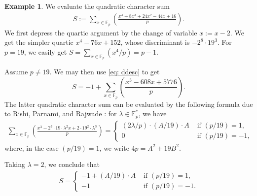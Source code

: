 \documentclass[11pt]{amsart}
\newcommand{\F}{\mathbb{F}}
\newcommand{\Fp}{\F_{\!p}}
\theoremstyle{definition}
\newtheorem{ex}{Example}[section]
\begin{document}
\begin{ex}
We evaluate the quadratic character sum
\begin{align}
S:=\sum_{x\in \Fp} \left(\frac{x^4+8x^3+24x^2-44x+16}{p}\right).
\end{align}
We first depress the quartic argument by the change of variable $x:=x-2$. We get the simpler quartic $x^4-76x+152$, whose discriminant is $-2^8\cdot 19^3$. For $p=19$, we easily get $S=\sum_{x\in \Fp} (x^4/p)=p-1$.

Assume $p\neq 19$. We may then use \eqref{eq: ddesc} to get
\[S=-1+\sum_{x\in \Fp} \left(\frac{x^3-608 x+5776}{p}\right).\]
The latter quadratic character sum can be evaluated by the following formula due to Rishi, Parnami, and Rajwade \cite{RPR}: for $\lambda\in \Fp^*$, we have
\begin{align*}
\sum_{x\in \Fp} \left(\frac{x^3-2^3\cdot 19\cdot  \lambda^2 x+2\cdot 19^2\cdot \lambda^3}{p}\right)=
\begin{cases}
(2\lambda /p) \cdot (A/19)\cdot A & \textrm{ if } (p/19)=1,\\ 
0  & \textrm{ if } (p/19)=-1,
\end{cases}
\end{align*}
where, in the case $(p/19)=1$, we write $4p=A^2+19B^2$.

Taking $\lambda=2$, we conclude that
\begin{align}
S=\begin{cases}
-1+(A/19)\cdot A & \textrm{ if } (p/19)=1,\\ 
-1  & \textrm{ if } (p/19)=-1.
\end{cases}
\end{align}
\end{ex}
\end{document}
